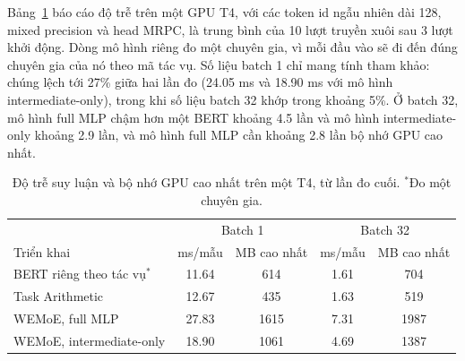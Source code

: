 Bảng~\ref{tab:latency} báo cáo độ trễ trên một GPU T4, với các token id ngẫu nhiên dài 128, mixed precision và head MRPC, là trung bình của 10 lượt truyền xuôi sau 3 lượt khởi động. Dòng mô hình riêng đo một chuyên gia, vì mỗi đầu vào sẽ đi đến đúng chuyên gia của nó theo mã tác vụ. Số liệu batch 1 chỉ mang tính tham khảo: chúng lệch tới 27\% giữa hai lần đo (24.05 ms và 18.90 ms với mô hình intermediate-only), trong khi số liệu batch 32 khớp trong khoảng 5\%. Ở batch 32, mô hình full MLP chậm hơn một BERT khoảng 4.5 lần và mô hình intermediate-only khoảng 2.9 lần, và mô hình full MLP cần khoảng 2.8 lần bộ nhớ GPU cao nhất.

\begin{table}[htbp]
  \centering\tablestyle
  \caption{Độ trễ suy luận và bộ nhớ GPU cao nhất trên một T4, từ lần đo cuối. $^{*}$Đo một chuyên gia.}
  \label{tab:latency}
  \begin{tabular}{l c c c c}
    \toprule
    & \multicolumn{2}{c}{Batch 1} & \multicolumn{2}{c}{Batch 32}\\
    Triển khai & ms/mẫu & MB cao nhất & ms/mẫu & MB cao nhất\\
    \midrule
    BERT riêng theo tác vụ$^{*}$ & 11.64 & 614 & 1.61 & 704\\
    Task Arithmetic & 12.67 & 435 & 1.63 & 519\\
    WEMoE, full MLP & 27.83 & 1615 & 7.31 & 1987\\
    WEMoE, intermediate-only & 18.90 & 1061 & 4.69 & 1387\\
    \bottomrule
  \end{tabular}
\end{table}
